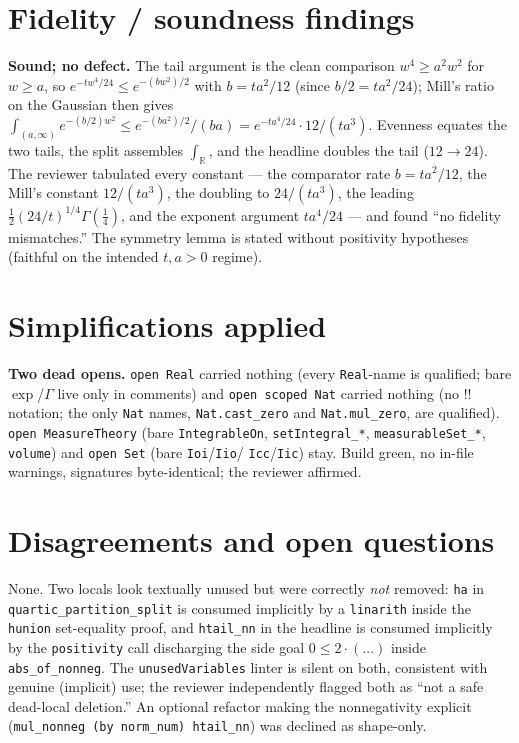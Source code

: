 \documentclass[11pt]{article}
\begin{document}
\section{Fidelity / soundness findings}
\textbf{Sound; no defect.} The tail argument is the clean comparison $w^4\ge a^2w^2$ for $w\ge a$, so
$e^{-tw^4/24}\le e^{-(b w^2)/2}$ with $b=ta^2/12$ (since $b/2=ta^2/24$); Mill's ratio on the Gaussian
then gives $\int_{(a,\infty)}e^{-(b/2)w^2}\le e^{-(ba^2)/2}/(ba)=e^{-ta^4/24}\cdot 12/(ta^3)$. Evenness
equates the two tails, the split assembles $\int_{\mathbb R}$, and the headline doubles the tail
($12\to24$). The reviewer tabulated every constant --- the comparator rate $b=ta^2/12$, the Mill's
constant $12/(ta^3)$, the doubling to $24/(ta^3)$, the leading $\tfrac12(24/t)^{1/4}\Gamma(\tfrac14)$,
and the exponent argument $ta^4/24$ --- and found ``no fidelity mismatches.'' The symmetry lemma is
stated without positivity hypotheses (faithful on the intended $t,a>0$ regime).

\section{Simplifications applied}
\textbf{Two dead opens.} \texttt{open Real} carried nothing (every \texttt{Real}-name is qualified;
bare $\exp$/$\Gamma$ live only in comments) and \texttt{open scoped Nat} carried nothing (no $!!$
notation; the only \texttt{Nat} names, \texttt{Nat.cast\_zero} and \texttt{Nat.mul\_zero}, are
qualified). \texttt{open MeasureTheory} (bare \texttt{IntegrableOn}, \texttt{setIntegral\_*},
\texttt{measurableSet\_*}, \texttt{volume}) and \texttt{open Set} (bare \texttt{Ioi}/\texttt{Iio}/
\texttt{Icc}/\texttt{Iic}) stay. Build green, no in-file warnings, signatures byte-identical; the
reviewer affirmed.

\section{Disagreements and open questions}
None. Two locals look textually unused but were correctly \emph{not} removed: \texttt{ha} in
\texttt{quartic\_partition\_split} is consumed implicitly by a \texttt{linarith} inside the
\texttt{hunion} set-equality proof, and \texttt{htail\_nn} in the headline is consumed implicitly by
the \texttt{positivity} call discharging the side goal $0\le 2\cdot(\dots)$ inside
\texttt{abs\_of\_nonneg}. The
\texttt{unusedVariables} linter is silent on both, consistent with genuine (implicit) use; the
reviewer independently flagged both as ``not a safe dead-local deletion.'' An optional refactor making
the nonnegativity explicit (\texttt{mul\_nonneg (by norm\_num) htail\_nn}) was declined as
shape-only.
\end{document}
